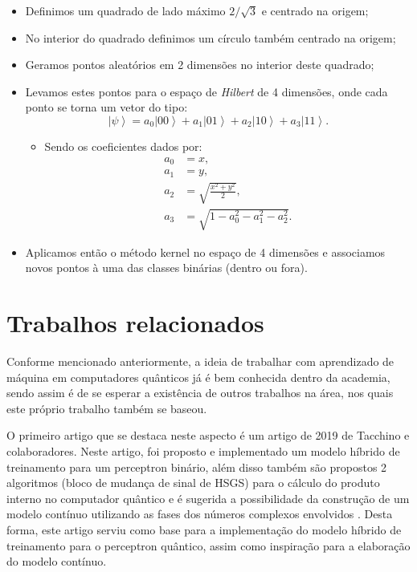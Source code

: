 \begin{itemize}
\item Definimos um quadrado de lado máximo $2/\sqrt{3}$  e centrado na origem;
\item No interior do quadrado definimos um círculo também centrado na origem;
\item Geramos pontos aleatórios em 2 dimensões no interior deste quadrado;
\item Levamos estes pontos para o espaço de \textit{Hilbert} de 4 dimensões, onde cada ponto se torna um vetor do tipo:\begin{equation}
\left|\psi\right\rangle =a_{0}\left|00\right\rangle +a_{1}\left|01\right\rangle +a_{2}\left|10\right\rangle +a_{3}\left|11\right\rangle 
. \end{equation}
\begin{itemize}
    \item Sendo os coeficientes dados por: \begin{equation}
\begin{split}
a_0 & = x,\\
a_1 & = y, \\
a _ 2 & =\sqrt{\frac{x^{2}+y^{2}}{2}},\\
a_3 & = \sqrt{1-a_{0}^{2}-a_{1}^{2}-a_{2}^{2}}.
\end{split}
\end{equation}
\end{itemize}
\item Aplicamos então o método kernel no espaço de 4 dimensões e associamos novos pontos à uma das classes binárias (dentro ou fora).
\end{itemize}

\section{Trabalhos relacionados}
Conforme mencionado anteriormente, a ideia de trabalhar com aprendizado de máquina em computadores quânticos já é bem conhecida dentro da academia, sendo assim é de se esperar a existência de outros trabalhos na área, nos quais este próprio trabalho também se baseou. 

O primeiro artigo que se destaca neste aspecto é um artigo de 2019  de Tacchino e colaboradores. Neste artigo, foi proposto e implementado um modelo híbrido de treinamento para um perceptron binário, além disso também são propostos 2 algoritmos (bloco de mudança de sinal de HSGS) para o cálculo do produto interno no computador quântico e é sugerida a possibilidade da construção de um modelo contínuo utilizando as fases dos números complexos envolvidos \cite{Italiano}.   Desta forma, este artigo serviu como base para a implementação do modelo híbrido de treinamento para o perceptron quântico, assim como inspiração para a elaboração do modelo contínuo.

